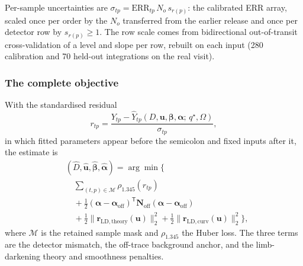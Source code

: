 Per-sample uncertainties are
$\sigma_{tp}=\mathrm{ERR}_{tp}\,N_o\,s_{r(p)}$: the calibrated ERR array,
scaled once per order by the $N_o$ transferred from the earlier release
and once per detector row by $s_{r(p)}\geq 1$. The row scale comes from
bidirectional out-of-transit cross-validation of a level and slope per
row, rebuilt on each input (280 calibration and 70 held-out integrations
on the real visit).

\subsubsection{The complete objective}


With the standardised residual
\begin{equation}
 r_{tp}=\frac{Y_{tp}-\widehat Y_{tp}
 (D,\bm{u},\bm{\beta},\bm{\alpha};\,q^\star,\Omega)}{\sigma_{tp}},
 \label{eq:residual}
\end{equation}
in which fitted parameters appear before the semicolon and fixed inputs
after it, the estimate is
\begin{equation}
\begin{split}
 &(\widehat D,\widehat{\bm{u}},\widehat{\bm{\beta}},
  \widehat{\bm{\alpha}})
 = \arg\min\Big\{ \\
 &\quad\sum_{(t,p)\in\mathcal{M}}\rho_{1.345}(r_{tp}) \\
 &\quad+\tfrac{1}{2}(\bm{\alpha}-\bm{\alpha}_{\mathrm{off}})^{\mathsf T}
   \bm{N}_{\mathrm{off}}(\bm{\alpha}-\bm{\alpha}_{\mathrm{off}}) \\
 &\quad+\tfrac{1}{2}\|\bm{r}_{\mathrm{LD,theory}}(\bm{u})\|_2^2
  +\tfrac{1}{2}\|\bm{r}_{\mathrm{LD,curv}}(\bm{u})\|_2^2
 \Big\},
\end{split}
 \label{eq:objective}
\end{equation}
where $\mathcal{M}$ is the retained sample mask and $\rho_{1.345}$ the
Huber loss. The three terms are the detector mismatch, the off-trace
background anchor, and the limb-darkening theory and smoothness
penalties.

